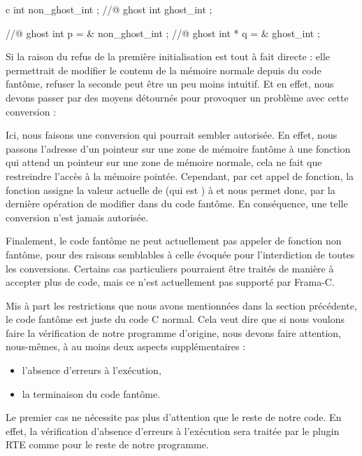 \begin{CodeBlock}{c}
int non_ghost_int ;
//@ ghost int ghost_int ;

//@ ghost int \ghost * p = & non_ghost_int ;
//@ ghost int * q = & ghost_int ;
\end{CodeBlock}


Si la raison du refus de la première initialisation est tout à fait directe : elle
permettrait de modifier le contenu de la mémoire normale depuis du code fantôme,
refuser la seconde peut être un peu moins intuitif. Et en effet, nous devons passer
par des moyens détournés pour provoquer un problème avec cette conversion :




Ici, nous faisons une conversion qui pourrait sembler autorisée. En effet, nous
passons l'adresse d'un pointeur sur une zone de mémoire fantôme à une fonction qui
attend un pointeur sur une zone de mémoire normale, cela ne fait que restreindre
l'accès à la mémoire pointée. Cependant, par cet appel de fonction, la fonction
 assigne la valeur actuelle de  (qui est
) à  et nous permet donc, par la dernière opération
de modifier  dans du code fantôme. En conséquence, une telle
conversion n'est jamais autorisée.


Finalement, le code fantôme ne peut actuellement pas appeler de fonction non
fantôme, pour des raisons semblables à celle évoquée pour l'interdiction de toutes
les conversions. Certains cas particuliers pourraient être traités de manière à
accepter plus de code, mais ce n'est actuellement pas supporté par Frama-C.


\label{l3:acsl-logic-definitions-what-remains}


Mis à part les restrictions que nous avons mentionnées dans la section précédente,
le code fantôme est juste du code C normal. Cela veut dire que si nous voulons
faire la vérification de notre programme d'origine, nous devons faire attention,
nous-mêmes, à au moins deux aspects supplémentaires :


\begin{itemize}
\item l'absence d'erreurs à l'exécution,
\item la terminaison du code fantôme.
\end{itemize}


Le premier cas ne nécessite pas plus d'attention que le reste de notre code.
En effet, la vérification d'absence d'erreurs à l'exécution sera traitée par
le plugin RTE comme pour le reste de notre programme.


